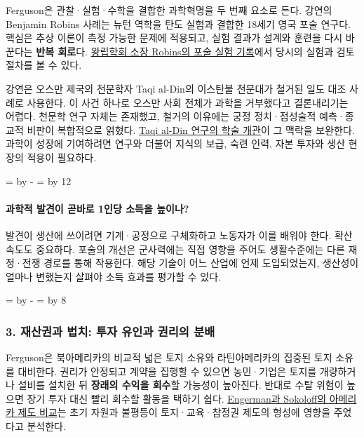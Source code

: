 \documentclass[10pt,a4paper]{article}
\newcommand{\ReserveQuestionSpace}{%
  \par\begingroup
  \dimen0=\pagegoal \advance\dimen0 by -\pagetotal
  \dimen2=\baselineskip \multiply\dimen2 by 12
  \ifdim\dimen0<\dimen2 \newpage\fi
  \endgroup}
\newcommand{\ReserveReadingSectionSpace}{%
  \par\begingroup
  \dimen0=\pagegoal \advance\dimen0 by -\pagetotal
  \dimen2=\baselineskip \multiply\dimen2 by 8
  \ifdim\dimen0<\dimen2 \newpage\fi
  \endgroup}
\begin{document}
Ferguson은 관찰·실험·수학을 결합한 과학혁명을 두 번째 요소로 든다. 강연의 Benjamin Robins 사례는 뉴턴 역학을 탄도 실험과 결합한 18세기 영국 포술 연구다. 핵심은 추상 이론이 측정 가능한 문제에 적용되고, 실험 결과가 설계와 훈련을 다시 바꾼다는 \textbf{반복 회로}다. \href{https://makingscience.royalsociety.org/items/l-and-p\_1\_123/report-of-the-committee-of-the-royal-society-appointed-to-examine-two-questions-in-gunnery}{왕립학회 소장 Robins의 포술 실험 기록}에서 당시의 실험과 검토 절차를 볼 수 있다.\par

강연은 오스만 제국의 천문학자 Taqi al-Din의 이스탄불 천문대가 철거된 일도 대조 사례로 사용한다. 이 사건 하나로 오스만 사회 전체가 과학을 거부했다고 결론내리기는 어렵다. 천문학 연구 자체는 존재했고, 철거의 이유에는 궁정 정치·점성술적 예측·종교적 비판이 복합적으로 얽혔다. \href{https://islamsci.mcgill.ca/RASI/BEA/Taqi\_al-Din\_BEA.htm}{Taqi al-Din 연구의 학술 개관}이 그 맥락을 보완한다. 과학이 성장에 기여하려면 연구와 더불어 지식의 보급, 숙련 인력, 자본 투자와 생산 현장의 적용이 필요하다.\par

\ReserveQuestionSpace
\paragraph{과학적 발견이 곧바로 1인당 소득을 높이나?}
발견이 생산에 쓰이려면 기계·공정으로 구체화하고 노동자가 이를 배워야 한다. 확산 속도도 중요하다. 포술의 개선은 군사력에는 직접 영향을 주어도 생활수준에는 다른 재정·전쟁 경로를 통해 작용한다. 해당 기술이 어느 산업에 언제 도입되었는지, 생산성이 얼마나 변했는지 살펴야 소득 효과를 평가할 수 있다.\par

\ReserveReadingSectionSpace
\subsubsection*{3. 재산권과 법치: 투자 유인과 권리의 분배}

Ferguson은 북아메리카의 비교적 넓은 토지 소유와 라틴아메리카의 집중된 토지 소유를 대비한다. 권리가 안정되고 계약을 집행할 수 있으면 농민·기업은 토지를 개량하거나 설비를 설치한 뒤 \textbf{장래의 수익을 회수}할 가능성이 높아진다. 반대로 수탈 위험이 높으면 장기 투자 대신 빨리 회수할 활동을 택하기 쉽다. \href{https://www.nber.org/papers/w9259}{Engerman과 Sokoloff의 아메리카 제도 비교}는 초기 자원과 불평등이 토지·교육·참정권 제도의 형성에 영향을 주었다고 분석한다.\par
\end{document}
